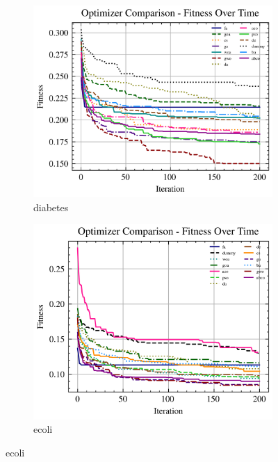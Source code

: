 \begin{figure}[htp]
    \begin{subfigure}[htp]{0.45\textwidth}
        \includegraphics[width=\textwidth]{imagenes/fitness_charts/img/binary/diabetes/optimizers_fitness_knn.png}
        \caption{diabetes}
        \label{fig:convergencia_diabetes_knn}
    \end{subfigure}
    \begin{subfigure}[htp]{0.45\textwidth}
        \includegraphics[width=\textwidth]{imagenes/fitness_charts/img/binary/ecoli/optimizers_fitness_knn.png}
        \caption{ecoli}
        \label{fig:convergencia_ecoli_knn}
    \end{subfigure}


\end{figure}
